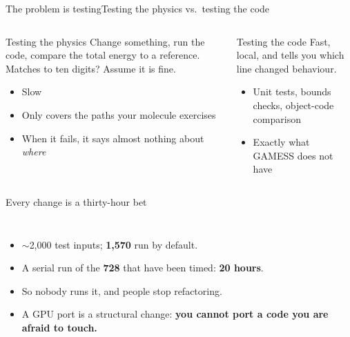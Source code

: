 \documentclass[aspectratio=169]{beamer}
\begin{document}
\begin{frame}{The problem is testing}{Testing the physics vs.\ testing the code}
  \begin{columns}[T,onlytextwidth]
      \begin{block}{Testing the physics}
        Change something, run the code, compare the total energy to a reference. Matches to ten digits? Assume it is fine.
        \begin{itemize}\setlength\itemsep{2pt}
          \item Slow
          \item Only covers the paths your molecule exercises
          \item When it fails, it says almost nothing about \emph{where}
        \end{itemize}
      \end{block}
      \begin{exampleblock}{Testing the code}
        Fast, local, and tells you which line changed behaviour.
        \begin{itemize}\setlength\itemsep{2pt}
          \item Unit tests, bounds checks, object-code comparison
          \item Exactly what GAMESS does not have
        \end{itemize}
      \end{exampleblock}
  \end{columns}
\end{frame}

\begin{frame}{Every change is a thirty-hour bet}
  \begin{columns}[T,onlytextwidth]
      \begin{itemize}\setlength\itemsep{5pt}
        \item $\sim$2,000 test inputs; \textbf{1,570} run by default.
        \item A serial run of the \textbf{728} that have been timed: \textbf{20 hours}.
        \item So nobody runs it, and people stop refactoring.
        \item A GPU port is a structural change: \textbf{you cannot port a code you are afraid to touch.}
      \end{itemize}
      \centering
  \end{columns}
\end{frame}
\end{document}
